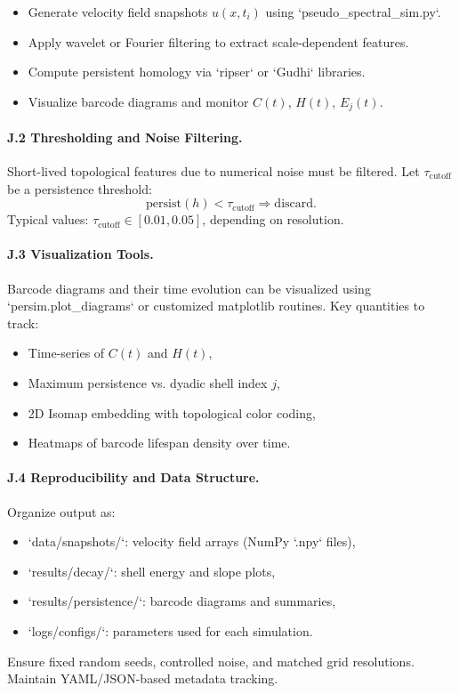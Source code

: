 \documentclass[11pt]{article}
\theoremstyle{definition}
\begin{document}
\begin{itemize}
  \item Generate velocity field snapshots $u(x,t_i)$ using `pseudo_spectral_sim.py`.
  \item Apply wavelet or Fourier filtering to extract scale-dependent features.
  \item Compute persistent homology via `ripser` or `Gudhi` libraries.
  \item Visualize barcode diagrams and monitor $C(t)$, $H(t)$, $E_j(t)$.
\end{itemize}

\paragraph{J.2 Thresholding and Noise Filtering.}
Short-lived topological features due to numerical noise must be filtered. Let $\tau_{\text{cutoff}}$ be a persistence threshold:
\[ \mathrm{persist}(h) < \tau_{\text{cutoff}} \Rightarrow \text{discard}. \]
Typical values: $\tau_{\text{cutoff}} \in [0.01, 0.05]$, depending on resolution.

\paragraph{J.3 Visualization Tools.}
Barcode diagrams and their time evolution can be visualized using `persim.plot_diagrams` or customized matplotlib routines. Key quantities to track:
\begin{itemize}
  \item Time-series of $C(t)$ and $H(t)$,
  \item Maximum persistence vs. dyadic shell index $j$,
  \item 2D Isomap embedding with topological color coding,
  \item Heatmaps of barcode lifespan density over time.
\end{itemize}

\paragraph{J.4 Reproducibility and Data Structure.}
Organize output as:
\begin{itemize}
  \item `data/snapshots/`: velocity field arrays (NumPy `.npy` files),
  \item `results/decay/`: shell energy and slope plots,
  \item `results/persistence/`: barcode diagrams and summaries,
  \item `logs/configs/`: parameters used for each simulation.
\end{itemize}
Ensure fixed random seeds, controlled noise, and matched grid resolutions. Maintain YAML/JSON-based metadata tracking.
\end{document}
